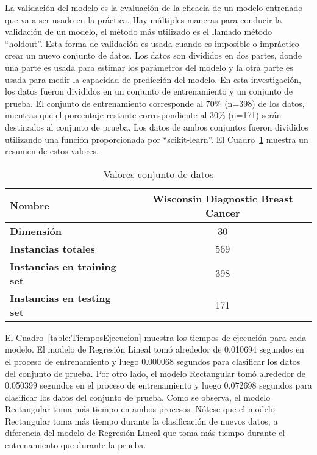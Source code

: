 \documentclass[conference]{IEEEtran}
\begin{document}
La validación del modelo es la evaluación de la eficacia de un modelo entrenado que va a ser usado en la práctica. Hay múltiples maneras para conducir la validación de un modelo, el método más utilizado es el llamado método ``holdout''. Esta forma de validación es usada cuando es imposible o impráctico crear un nuevo conjunto de datos. Los datos son divididos en dos partes, donde una parte es usada para estimar los parámetros del modelo y la otra parte es usada para medir la capacidad de predicción del modelo. En esta investigación, los datos fueron divididos en un conjunto de entrenamiento y un conjunto de prueba. El conjunto de entrenamiento corresponde al 70\% (n=398) de los datos, mientras que el porcentaje restante correspondiente al 30\% (n=171) serán destinados al conjunto de prueba. Los datos de ambos conjuntos fueron divididos utilizando una función proporcionada por ``scikit-learn''. El Cuadro~\ref{table:ValoresConjuntoDatos} muestra un resumen de estos valores.

\begin{table}[H]
	\caption{Valores conjunto de datos}
	\label{table:ValoresConjuntoDatos}
	\begin{center}
		\begin{tabular}{|l|c|}
			\hline
			\textbf{Nombre} &  Wisconsin Diagnostic Breast Cancer\\ \hline
			\textbf{Dimensión} &  30 \\ \hline
			\textbf{Instancias totales} &  569 \\ \hline
			\textbf{Instancias en training set} &  398\\ \hline
			\textbf{Instancias en testing set} &  171 \\ \hline
		\end{tabular}
	\end{center}
\end{table}

El Cuadro~\ref{table:TiemposEjecucion} muestra los tiempos de ejecución para cada modelo. El modelo de Regresión Lineal tomó alrededor de 0.010694 segundos en el proceso de entrenamiento y luego 0.000068 segundos para clasificar los datos del conjunto de prueba. Por otro lado, el modelo Rectangular tomó alrededor de 0.050399 segundos en el proceso de entrenamiento y luego 0.072698 segundos para clasificar los datos del conjunto de prueba. Como se observa, el modelo Rectangular toma más tiempo en ambos procesos. Nótese que el modelo Rectangular toma más tiempo durante la clasificación de nuevos datos, a diferencia del modelo de Regresión Lineal que toma más tiempo durante el entrenamiento que durante la prueba.
\end{document}
